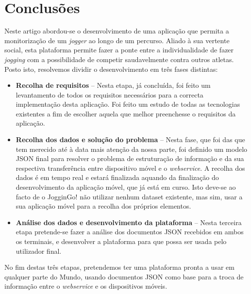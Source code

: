 \documentclass[twocolumn,twoside,10pt,a4paper]{article}
\begin{document}
\section{Conclusões}\label{sec:conclusions}

Neste artigo abordou-se o desenvolvimento de uma aplicação que permita a monitorização de um \textit{jogger} ao longo de um percurso. Aliado à sua vertente social, esta plataforma permite fazer a ponte entre a individualidade de fazer \textit{jogging} com a possibilidade de competir saudavelmente contra outros atletas.
Posto isto, resolvemos dividir o desenvolvimento em três fases distintas:

\begin{itemize}
\item \textbf{Recolha de requisitos} -- Nesta etapa, já concluída, foi feito um levantamento de todos os requisitos necessários para a correcta implementação desta aplicação. Foi feito um estudo de todas as tecnologias existentes a fim de escolher aquela que melhor preenchesse o requisitos da aplicação.
\item \textbf{Recolha dos dados e solução do problema} -- Nesta fase, que foi das que tem merecido até à data mais atenção da nossa parte, foi definido um modelo JSON final para resolver o problema de estruturação de informação e da sua respectiva transferência entre dispositivo móvel e o \textit{webservice}. A recolha dos dados é em tempo real e estará finalizada aquando da finalização do desenvolvimento da aplicação móvel, que já está em curso. Isto deve-se ao facto de o JogginGo! não utilizar nenhum dataset existente, mas sim, usar a sua aplicação móvel para a recolha dos próprios elementos.
\item \textbf{Análise dos dados e desenvolvimento da plataforma}  -- Nesta terceira etapa pretende-se fazer a análise dos documentos JSON recebidos em ambos os terminais, e desenvolver a plataforma para que possa ser usada pelo utilizador final.
\end{itemize}

No fim destas três etapas, pretendemos ter uma plataforma pronta a usar em qualquer parte do Mundo, usando documentos JSON como base para a troca de informação entre o \textit{webservice} e os dispositivos móveis.


\nocite{*}
\renewcommand{\bibname}{Referências}
%
%

%
{}
\end{document}
